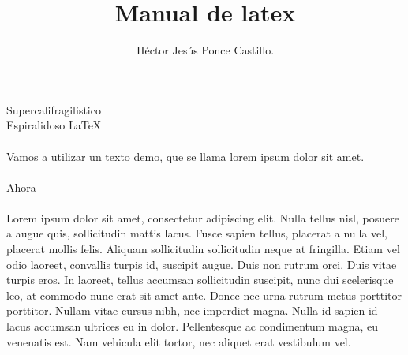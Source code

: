 \documentclass[10pt,letterpaper]{article}
\author{Héctor Jesús Ponce Castillo.}
\title{Manual de latex}
\begin{document}
		Supercalifragilistico\\  %
		Espiralidoso \LaTeX{}  %
		\\ \\
Vamos a utilizar un texto demo, que se llama lorem ipsum dolor sit amet.\\ \\
Ahora \\ \\
Lorem ipsum dolor sit amet, consectetur adipiscing elit. Nulla tellus nisl, posuere a augue quis, sollicitudin mattis lacus. Fusce sapien tellus, placerat a nulla vel, placerat mollis felis. Aliquam sollicitudin sollicitudin neque at fringilla. Etiam vel odio laoreet, convallis turpis id, suscipit augue. Duis non rutrum orci. Duis vitae turpis eros. In laoreet, tellus accumsan sollicitudin suscipit, nunc dui scelerisque leo, at commodo nunc erat sit amet ante. Donec nec urna rutrum metus porttitor porttitor. Nullam vitae cursus nibh, nec imperdiet magna. Nulla id sapien id lacus accumsan ultrices eu in dolor. Pellentesque ac condimentum magna, eu venenatis est. Nam vehicula elit tortor, nec aliquet erat vestibulum vel.

\end{document}
